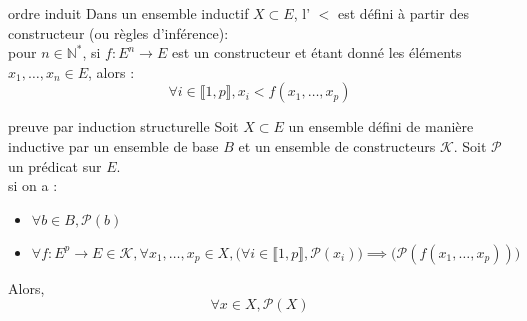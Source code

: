 \begin{definition}{6.47}{ordre induit}
    Dans un ensemble inductif $ X \subset E $, l' $<$ est défini à partir des constructeur (ou règles d'inférence): \\ pour $n \in \mathbb{N}^*$, si $f:E^n \rightarrow E$ est un constructeur et étant donné les éléments $x_1, \ldots, x_n \in E$, alors : $$\forall i \in \llbracket 1,p \rrbracket, x_i < f(x_1,\ldots,x_p)$$
\end{definition}

\begin{theoreme}{6.48}{preuve par induction structurelle}
    Soit $X \subset E$ un ensemble défini de manière inductive par un ensemble de base $B$ et un ensemble de constructeurs $\mathcal{K}$. Soit $\mathcal{P}$ un prédicat sur $E$. \\ si on a : \begin{itemize}
        \item $\forall b \in B, \mathcal{P}(b)$
        \item $\forall f : E^p \rightarrow E \in \mathcal{K}, \forall x_1,\ldots, x_p \in X, \bigl(\forall i \in \llbracket 1,p \rrbracket, \mathcal{P}(x_i)\bigr) \implies \bigl(\mathcal{P}(f(x_1,\ldots,x_p))\bigr)$
    \end{itemize}
    Alors, $$\forall x \in X, \mathcal{P}(X)$$
\end{theoreme}

